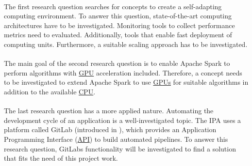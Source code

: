 \paragraph{}
The first research question searches for concepts to create a self-adapting computing environment.
To answer this question, state-of-the-art computing architectures have to be investigated.
Monitoring tools to collect performance metrics need to evaluated. Additionally, tools that enable fast deployment of computing units.
Furthermore, a suitable scaling approach has to be investigated.


\paragraph{}
The main goal of the second research question is to enable Apache Spark to perform algorithms with \hyperlink{abbr:gpu}{GPU} acceleration included.
Therefore, a concept needs to be investigated to extend Apache Spark to use \hyperlink{abbr:gpu}{GPUs} for suitable algorithms in addition to the available \hyperlink{abbr:cpu}{CPU}.


\paragraph{}
The last research question has a more applied nature.
Automating the development cycle of an application is a well-investigated topic.
The IPA uses a platform called GitLab (introduced in ), which provides an Application Programming Interface (\hyperlink{abbr:api}{API}) to build automated pipelines.
To answer this research question, GitLabs functionality will be investigated to find a solution that fits the need of this project work.


